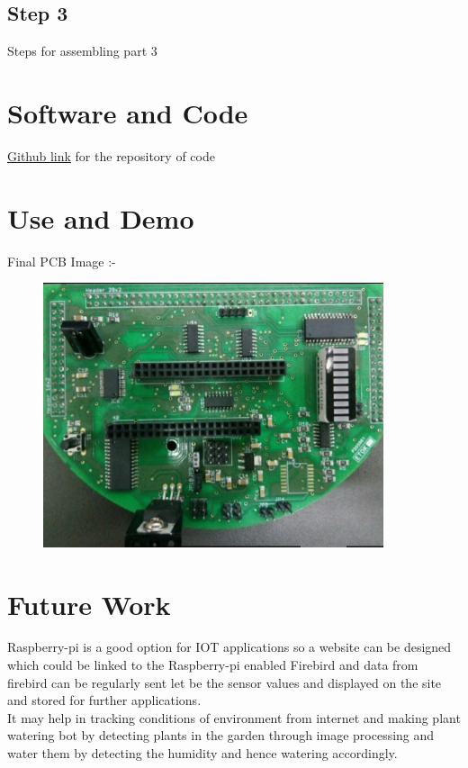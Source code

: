\documentclass[a4paper,12pt,oneside]{book}
\begin{document}
\subsection*{Step 3}
Steps for assembling part 3



\section{Software and Code}
\href{https://github.com/eYSIP-2017/eYSIP-2017_Fi_Pi/tree/master/codes/Experiments}{Github link} for the repository of code
\newpage
\section{Use and Demo}
Final PCB Image :-
\begin{figure}[h!]
\includegraphics[width=10cm]{pcb.png}
\centering
\caption{}
\end{figure}

\section{Future Work}
Raspberry-pi is a good option for IOT applications so a website can be designed which could be linked to the Raspberry-pi enabled Firebird and data from firebird can be regularly sent let be the sensor values and displayed on the site and stored for further applications.\\
It may help in tracking conditions of environment from internet and making plant watering bot by detecting plants in the garden through image processing and water them by detecting the humidity and hence watering accordingly. 
\end{document}
